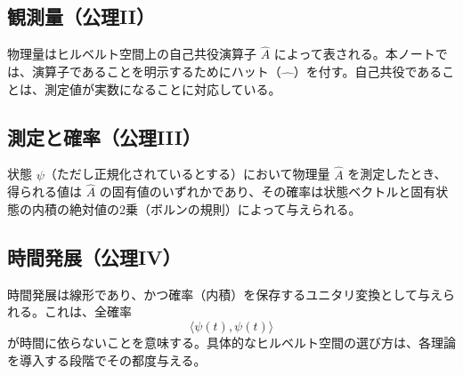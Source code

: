 \subsection{観測量（公理II）}
物理量はヒルベルト空間上の自己共役演算子 $\hat{A}$ によって表される。本ノートでは、演算子であることを明示するためにハット（$\hat{\quad}$）を付す。自己共役であることは、測定値が実数になることに対応している。

\subsection{測定と確率（公理III）}
状態 $\psi$（ただし正規化されているとする）において物理量 $\hat{A}$ を測定したとき、得られる値は $\hat{A}$ の固有値のいずれかであり、その確率は状態ベクトルと固有状態の内積の絶対値の2乗（ボルンの規則）によって与えられる。

\subsection{時間発展（公理IV）}
時間発展は線形であり、かつ確率（内積）を保存するユニタリ変換として与えられる。これは、全確率
\[
\langle \psi(t),\psi(t)\rangle
\]
が時間に依らないことを意味する。具体的なヒルベルト空間の選び方は、各理論を導入する段階でその都度与える。
